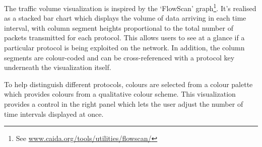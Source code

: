 The traffic volume visualization is inspired by the `FlowScan'
graph\footnote{See \url{www.caida.org/tools/utilities/flowscan/}}.
It's realised as a stacked bar chart which displays the volume of data arriving
in each time interval, with column segment heights proportional to the total
number of packets transmitted for each protocol. This allows users to see at a
glance if a particular protocol is being exploited on the network. In addition,
the column segments are colour-coded and can be cross-referenced with a
protocol key underneath the visualization itself.

To help distinguish different protocols, colours are selected from a colour
palette which provides colours from a qualitative colour scheme.
This visualization provides a control in the right panel which lets the user
adjust the number of time intervals displayed at once.
